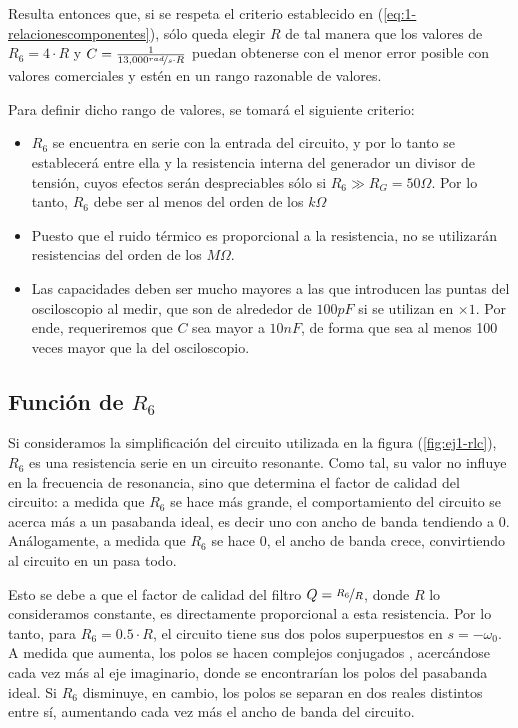\documentclass[../../tc_tp3_main.tex]{subfiles}
\begin{document}
 Resulta entonces que, si se respeta el criterio establecido en (\ref{eq:1-relacionescomponentes}), s\'olo queda elegir $R$ de tal manera que los valores de $R_6 = 4\cdot R$ y $C = \frac{1}{13,000 \nicefrac{rad}{s} \cdot R}$ puedan obtenerse con el menor error posible con valores comerciales y est\'en en un rango razonable de valores. \par
 
 Para definir dicho rango de valores, se tomar\'a el siguiente criterio:
 
 \begin{itemize}
	\item  $R_6$ se encuentra en serie con la entrada del circuito, y por lo tanto se establecer\'a entre ella y la resistencia interna del generador un divisor de tensi\'on, cuyos efectos ser\'an despreciables s\'olo si $R_6 \gg R_G = 50\Omega$. Por lo tanto, $R_6$ debe ser al menos del orden de los $k \Omega$
	\item Puesto que el ruido t\'ermico es proporcional a la resistencia, no se utilizar\'an resistencias del orden de los $M\Omega$.
  	\item Las capacidades deben ser mucho mayores a las que introducen las puntas del osciloscopio al medir, que son de alrededor de $100pF$ si se utilizan en $\times 1$. Por ende, requeriremos que $C$ sea mayor a $10nF$, de forma que sea al menos 100 veces mayor que la del osciloscopio. 
 \end{itemize}



\subsection{Funci\'on de $R_6$}


Si consideramos la simplificaci\'on del circuito utilizada en la figura (\ref{fig:ej1-rlc}), $R_6$ es una resistencia serie en un circuito resonante. Como tal, su valor no influye en la frecuencia de resonancia, sino que determina el factor de calidad del circuito: a medida que $R_6$ se hace m\'as grande, el comportamiento del circuito se acerca m\'as a un pasabanda ideal, es decir uno con ancho de banda tendiendo a 0. An\'alogamente, a medida que $R_6$ se hace 0, el ancho de banda crece, convirtiendo al circuito en un pasa todo. \par

Esto se debe a que el factor de calidad del filtro $Q = \nicefrac{R_6}{R}$, donde $R$ lo consideramos constante, es directamente proporcional a esta resistencia. Por lo tanto, para $R_6=0.5\cdot R$, el circuito tiene sus dos polos superpuestos en $s = -\omega_0$. A medida que aumenta, los polos se hacen complejos conjugados , acerc\'andose cada vez m\'as al eje imaginario, donde se encontrar\'ian los polos del pasabanda ideal. Si $R_6$ disminuye, en cambio, los polos se separan en dos reales distintos entre s\'i,   aumentando cada vez m\'as el ancho de banda del circuito. \par
\end{document}
